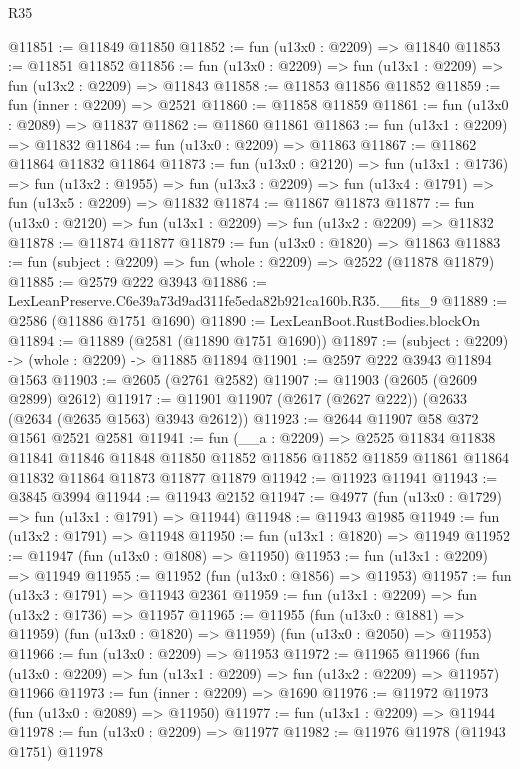 \begin{lexlean}{R35}
\begin{coremodule}
@11851 := @11849 @11850
@11852 := fun (u13x0 : @2209) => @11840
@11853 := @11851 @11852
@11856 := fun (u13x0 : @2209) => fun (u13x1 : @2209) => fun (u13x2 : @2209) => @11843
@11858 := @11853 @11856 @11852
@11859 := fun (inner : @2209) => @2521
@11860 := @11858 @11859
@11861 := fun (u13x0 : @2089) => @11837
@11862 := @11860 @11861
@11863 := fun (u13x1 : @2209) => @11832
@11864 := fun (u13x0 : @2209) => @11863
@11867 := @11862 @11864 @11832 @11864
@11873 := fun (u13x0 : @2120) =>
  fun (u13x1 : @1736) =>
  fun (u13x2 : @1955) => fun (u13x3 : @2209) => fun (u13x4 : @1791) => fun (u13x5 : @2209) => @11832
@11874 := @11867 @11873
@11877 := fun (u13x0 : @2120) => fun (u13x1 : @2209) => fun (u13x2 : @2209) => @11832
@11878 := @11874 @11877
@11879 := fun (u13x0 : @1820) => @11863
@11883 := fun (subject : @2209) => fun (whole : @2209) => @2522 (@11878 @11879)
@11885 := @2579 @222 @3943
@11886 := LexLeanPreserve.C6e39a73d9ad311fe5eda82b921ca160b.R35.__fits_9
@11889 := @2586 (@11886 @1751 @1690)
@11890 := LexLeanBoot.RustBodies.blockOn
@11894 := @11889 (@2581 (@11890 @1751 @1690))
@11897 := (subject : @2209) -> (whole : @2209) -> @11885 @11894
@11901 := @2597 @222 @3943 @11894 @1563
@11903 := @2605 (@2761 @2582)
@11907 := @11903 (@2605 (@2609 @2899) @2612)
@11917 := @11901 @11907 (@2617 (@2627 @222)) (@2633 (@2634 (@2635 @1563) @3943 @2612))
@11923 := @2644 @11907 @58 @372 @1561 @2521 @2581
@11941 := fun (__a : @2209) =>
  @2525
    @11834
    @11838
    @11841
    @11846
    @11848
    @11850
    @11852
    @11856
    @11852
    @11859
    @11861
    @11864
    @11832
    @11864
    @11873
    @11877
    @11879
@11942 := @11923 @11941
@11943 := @3845 @3994
@11944 := @11943 @2152
@11947 := @4977 (fun (u13x0 : @1729) => fun (u13x1 : @1791) => @11944)
@11948 := @11943 @1985
@11949 := fun (u13x2 : @1791) => @11948
@11950 := fun (u13x1 : @1820) => @11949
@11952 := @11947 (fun (u13x0 : @1808) => @11950)
@11953 := fun (u13x1 : @2209) => @11949
@11955 := @11952 (fun (u13x0 : @1856) => @11953)
@11957 := fun (u13x3 : @1791) => @11943 @2361
@11959 := fun (u13x1 : @2209) => fun (u13x2 : @1736) => @11957
@11965 := @11955
    (fun (u13x0 : @1881) => @11959)
    (fun (u13x0 : @1820) => @11959)
    (fun (u13x0 : @2050) => @11953)
@11966 := fun (u13x0 : @2209) => @11953
@11972 := @11965
    @11966
    (fun (u13x0 : @2209) => fun (u13x1 : @2209) => fun (u13x2 : @2209) => @11957)
    @11966
@11973 := fun (inner : @2209) => @1690
@11976 := @11972 @11973 (fun (u13x0 : @2089) => @11950)
@11977 := fun (u13x1 : @2209) => @11944
@11978 := fun (u13x0 : @2209) => @11977
@11982 := @11976 @11978 (@11943 @1751) @11978

\end{coremodule}
\end{lexlean}
